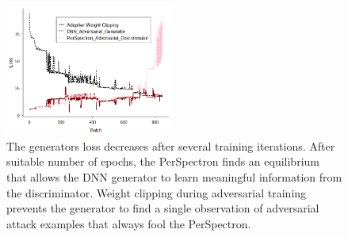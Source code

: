 \begin{figure}[ht!] 
\centering
\includegraphics[width=0.49\textwidth]{PerSpectron-Micro2020-camera-R/img/Loss2.png}
\vspace*{-4mm}
\caption{The generators loss decreases after several training iterations. After suitable number of epochs, the PerSpectron finds an equilibrium that allows the DNN generator to learn meaningful information from the discriminator. Weight clipping during adversarial training prevents the generator to find a single observation of adversarial attack examples that always fool the PerSpectron.  }
 
\label{fig:sature}
\end{figure}






